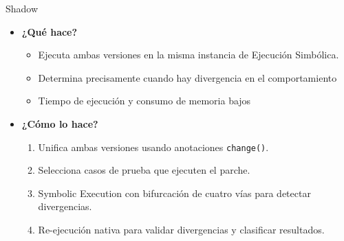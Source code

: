 \documentclass{beamer}
\begin{document}
\begin{frame}{Shadow}
\begin{itemize}
  \item \textbf{¿Qué hace?}
  \begin{itemize}
    \item Ejecuta ambas versiones en la misma instancia de Ejecución Simbólica.
    \item Determina precisamente cuando hay divergencia en el comportamiento
    \item Tiempo de ejecución y consumo de memoria bajos
  \end{itemize}
  \item \textbf{¿Cómo lo hace?}
  \begin{enumerate}
    \item Unifica ambas versiones usando anotaciones \texttt{change()}.
    \item Selecciona casos de prueba que ejecuten el parche.
    \item Symbolic Execution con bifurcación de cuatro vías para detectar divergencias.
    \item Re-ejecución nativa para validar divergencias y clasificar resultados.
  \end{enumerate}
\end{itemize}
  \end{frame}
\end{document}
